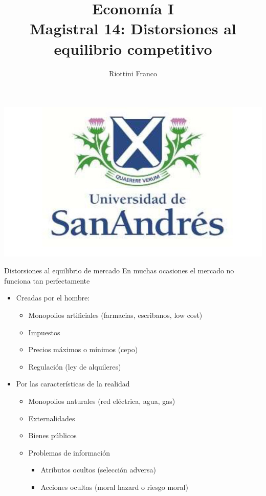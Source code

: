 \documentclass{beamer}
\title[Economía I]{Economía I \vspace{4mm}
\\ Magistral 14: Distorsiones al equilibrio competitivo}
\date{}
\author[Riottini]{Riottini Franco}
\institute[]{Universidad de San Andrés}
\begin{document}
\begin{frame}
\titlepage
\centering
\includegraphics[scale=0.2]{../Figures/logoUDESA.jpg} 
\end{frame}

\begin{frame}{Distorsiones al equilibrio de mercado}
    En muchas ocasiones el mercado no funciona tan perfectamente
    \begin{itemize}
        \item Creadas por el hombre:
        \begin{itemize}
            \item Monopolios artificiales (farmacias, escribanos, low cost)
             \vspace{1mm}
            \item Impuestos
             \vspace{1mm}
            \item Precios máximos o mínimos (cepo)
             \vspace{1mm}
            \item Regulación (ley de alquileres)
        \end{itemize}
        \item Por las características de la realidad
        \begin{itemize}
            \item Monopolios naturales (red eléctrica, agua, gas)   
             \vspace{1mm}
            \item Externalidades
             \vspace{1mm}
            \item Bienes públicos
            \vspace{1mm}
            \item Problemas de información
            \begin{itemize}
                \item Atributos ocultos (selección adversa)
                 \vspace{1mm}
                \item Acciones ocultas (moral hazard o riesgo moral)
            \end{itemize}        
        \end{itemize}
    \end{itemize}
\end{frame}
\end{document}
